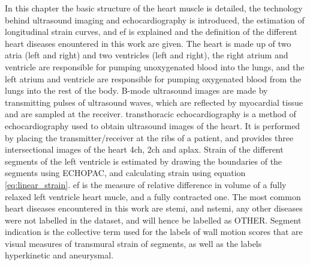 In this chapter the basic structure of the heart muscle is detailed, the technology behind ultrasound imaging and echocardiography is introduced, the estimation of longitudinal strain curves, and \acrshort{ef} is explained and the definition of the different heart diseases enountered in this work are given. The heart is made up of two atria (left and right) and two ventricles (left and right), the right atrium and ventricle are responsible for pumping unoxygenated blood into the lungs, and the left atrium and ventricle are responsible for pumping oxygenated blood from the lungs into the rest of the body. B-mode ultrasound images are made by transmitting pulses of ultrasound waves, which are reflected by myocardial tissue and are sampled at the receiver. transthoracic echocardiography is a method of echocardiography used to obtain ultrasound images of the heart. It is performed by placing the transmitter/receiver at the ribs of a patient, and provides three intersectional images of the heart \acrshort{4ch}, \acrshort{2ch} and \acrshort{aplax}. Strain of the different segments of the left ventricle is estimated by drawing the boundaries of the segments using ECHOPAC, and calculating strain using equation \eqref{eq:linear_strain}. \acrshort{ef} is the measure of relative difference in volume of a fully relaxed left ventricle heart mucle, and a fully contracted one. The most common heart diseases encountered in this work are \acrshort{stemi}, and \acrshort{nstemi}, any other diseases were not labelled in the dataset, and will hence be labelled as OTHER. Segment indication is the collective term used for the labels of wall motion scores that are visual measures of transmural strain of segments, as well as the labels hyperkinetic and aneurysmal.